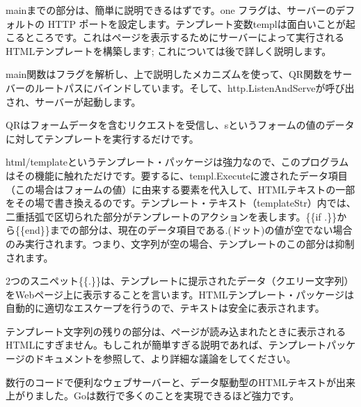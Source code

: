 \documentclass{jsarticle}
\begin{document}
mainまでの部分は、簡単に説明できるはずです。one
フラグは、サーバーのデフォルトの HTTP
ポートを設定します。テンプレート変数templは面白いことが起こるところです。これはページを表示するためにサーバーによって実行されるHTMLテンプレートを構築します;
これについては後で詳しく説明します。

main関数はフラグを解析し、上で説明したメカニズムを使って、QR関数をサーバーのルートパスにバインドしています。そして、http.ListenAndServeが呼び出され、サーバーが起動します。

QRはフォームデータを含むリクエストを受信し、sというフォームの値のデータに対してテンプレートを実行するだけです。

html/templateというテンプレート・パッケージは強力なので、このプログラムはその機能に触れただけです。要するに、templ.Executeに渡されたデータ項目（この場合はフォームの値）に由来する要素を代入して、HTMLテキストの一部をその場で書き換えるのです。テンプレート・テキスト（templateStr）内では、二重括弧で区切られた部分がテンプレートのアクションを表します。\{\{if
.\}\}から\{\{end\}\}までの部分は、現在のデータ項目である.(ドット)の値が空でない場合のみ実行されます。つまり、文字列が空の場合、テンプレートのこの部分は抑制されます。

2つのスニペット\{\{.\}\}は、テンプレートに提示されたデータ（クエリー文字列）をWebページ上に表示することを言います。HTMLテンプレート・パッケージは自動的に適切なエスケープを行うので、テキストは安全に表示されます。

テンプレート文字列の残りの部分は、ページが読み込まれたときに表示されるHTMLにすぎません。もしこれが簡単すぎる説明であれば、テンプレートパッケージの{ドキュメント}を参照して、より詳細な議論をしてください。

数行のコードで便利なウェブサーバーと、データ駆動型のHTMLテキストが出来上がりました。Goは数行で多くのことを実現できるほど強力です。
\end{document}
